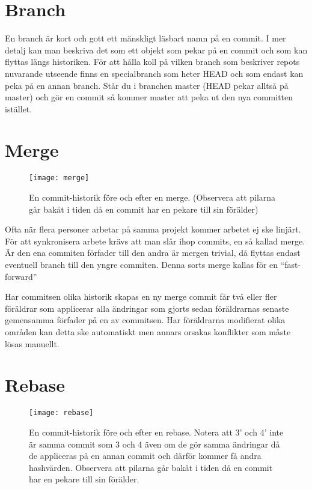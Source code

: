 \documentclass[a4paper,12pt]{article}
\begin{document}
\section{Branch}

En branch är kort och gott ett mänskligt läsbart namn på en commit.
I mer detalj kan man beskriva det som ett objekt som pekar på en commit och som kan flyttas längs historiken.
För att hålla koll på vilken branch som beskriver repots nuvarande utseende finns en specialbranch som heter HEAD och som endast kan peka på en annan branch.
Står du i branchen master (HEAD pekar alltså på master) och gör en commit så kommer master att peka ut den nya committen istället.

\section{Merge}

\begin{figure}
  \texttt{[image: merge]}
  \caption{En commit-historik före och efter en merge.
    (Observera att pilarna går bakåt i tiden då en commit har en pekare till sin förälder)
  }
  \label{fig:merge}
\end{figure}


Ofta när flera personer arbetar på samma projekt kommer arbetet ej ske linjärt.
För att synkronisera arbete krävs att man slår ihop commits, en så kallad merge.
Är den ena commiten förfader till den andra är mergen trivial, då flyttas endast eventuell branch till den yngre commiten.
Denna sorts merge kallas för en ``fast-forward''

Har commitsen olika historik skapas en ny merge commit får två eller fler föräldrar som applicerar alla ändringar som gjorts sedan föräldrarnas senaste gemensamma förfader på en av commitsen.
Har föräldrarna modifierat olika områden kan detta ske automatiskt men annars orsakas konflikter som måste lösas manuellt.

\section{Rebase}

\begin{figure}
  \texttt{[image: rebase]}
  \caption{
    En commit-historik före och efter en rebase. 
    Notera att 3' och 4' inte är samma commit som 3 och 4 även om de gör samma ändringar då de appliceras på en annan commit och därför kommer få andra hashvärden.
    Observera att pilarna går bakåt i tiden då en commit har en pekare till sin förälder.
  }
  \label{fig:rebase}
\end{figure}
\end{document}
